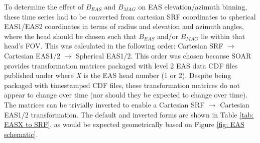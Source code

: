 To determine the effect of \(B_{EAS}\) and \(B_{MAG}\) on EAS elevation/azimuth binning, these time series had to be converted from cartesian SRF coordinates to spherical EAS1/EAS2 coordinates in terms of radius and elevation and azimuth angles, where the head should be chosen such that \(B_{EAS}\) and/or \(B_{MAG}\) lie within that head's FOV. This was calculated in the following order: Cartesian SRF \(\rightarrow\) Cartesian EAS1/2 \(\rightarrow\) Spherical EAS1/2. This order was chosen because SOAR provides  transformation matrices packaged with level 2 EAS data CDF files published under  where \textit{X} is the EAS head number (1 or 2). Despite being packaged with timestamped CDF files, these transformation matrices do not appear to change over time (nor should they be expected to change over time). The matrices can be trivially inverted to enable a Cartesian SRF \(\rightarrow\) Cartesian EAS1/2 transformation. The default and inverted forms are shown in Table \ref{tab: EASX to SRF}, as would be expected geometrically based on Figure \ref{fig: EAS schematic}.

